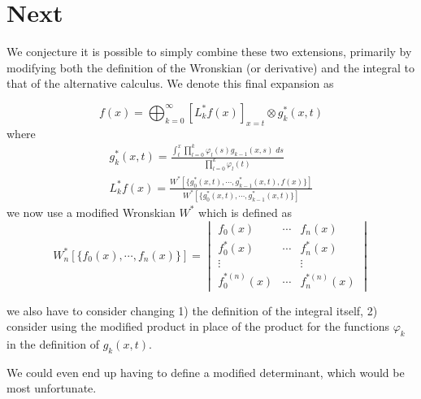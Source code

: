\documentclass{article}
\begin{document}
\section{Next}
We conjecture it is possible to simply combine these two extensions, primarily by modifying both the definition of the Wronskian (or derivative) and the integral to that of the alternative calculus. We denote this final expansion as

$$
f(x) = \bigoplus_{k=0}^{\infty} \left[L^*_k f(x)\right]_{x=t} \otimes g^*_k(x,t)
$$
where
\begin{align}
g^*_k(x,t) = \frac{\int_t^x \prod_{l=0}^k \varphi_l(s)g_{k-1}(x,s)\;ds}{\prod_{l=0}^k \varphi_l(t)} \\
L^*_k f(x) = \frac{W^*[\{g^*_0(x,t),\cdots,g^*_{k-1}(x,t),f(x)\}]}{W^*[\{g^*_0(x,t),\cdots,g^*_{k-1}(x,t)\}]}
\end{align}
we now use a modified Wronskian $W^*$ which is defined as 
$$
W^*_{n}[\{f_0(x), \cdots, f_n(x)\}] = \begin{vmatrix}
f_0(x) & \cdots & f_n(x) \\
f^*_0(x) & \cdots & f^*_n(x) \\
\vdots & & \vdots \\
f^{*(n)}_0(x) & \cdots & f^{*(n)}_n(x)
\end{vmatrix}
$$

we also have to consider changing 1) the definition of the integral itself, 2) consider using the modified product in place of the product for the functions $\varphi_k$ in the definition of $g_k(x,t)$.

We could even end up having to define a modified determinant, which would be most unfortunate.
\end{document}
